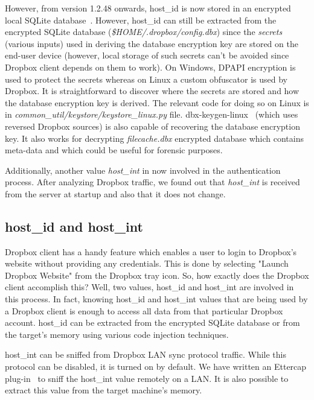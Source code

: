 \documentclass[letterpaper,twocolumn,10pt]{article}
\begin{document}
However, from version 1.2.48 onwards, host\_id is now stored in an encrypted
local SQLite database~\cite{sqlite-dbx}. However, host\_id can still be
extracted from the encrypted SQLite database
(\emph{\$HOME/.dropbox/config.dbx}) since the \emph{secrets} (various inputs)
used in deriving the database encryption key are stored on the end-user device
(however, local storage of such secrets can't be avoided since Dropbox client
depends on them to work). On Windows, DPAPI encryption is used to protect the
secrets whereas on Linux a custom obfuscator is used by Dropbox. It is
straightforward to discover where the secrets are stored and how the database
encryption key is derived. The relevant code for doing so on Linux is in
\emph{common\_util/keystore/keystore\_linux.py} file.
dbx-keygen-linux~\cite{dbx-keygen-linux} (which uses reversed Dropbox sources)
is also capable of recovering the database encryption key. It also works for
decrypting \emph{filecache.dbx} encrypted database which contains meta-data
and which could be useful for forensic purposes.

Additionally, another value \emph{host\_int} in now involved in the
authentication process. After analyzing Dropbox traffic, we found out that
\emph{host\_int} is received from the server at startup and also that it does
not change.

\subsection{host\_id and host\_int}
Dropbox client has a handy feature which enables a user to login to Dropbox's
website without providing any credentials. This is done by selecting "Launch
Dropbox Website" from the Dropbox tray icon. So, how exactly does the Dropbox
client accomplish this? Well, two values, host\_id and host\_int are involved
in this process. In fact, knowing host\_id and host\_int values that are being
used by a Dropbox client is enough to access all data from that particular
Dropbox account. host\_id can be extracted from the encrypted SQLite database
or from the target's memory using various code injection techniques.

host\_int can be sniffed from Dropbox LAN sync protocol traffic. While this
protocol can be disabled, it is turned on by default. We have written an
Ettercap plug-in~\cite{ettercap} to sniff the host\_int value remotely on a
LAN. It is also possible to extract this value from the target machine's
memory.
\end{document}
